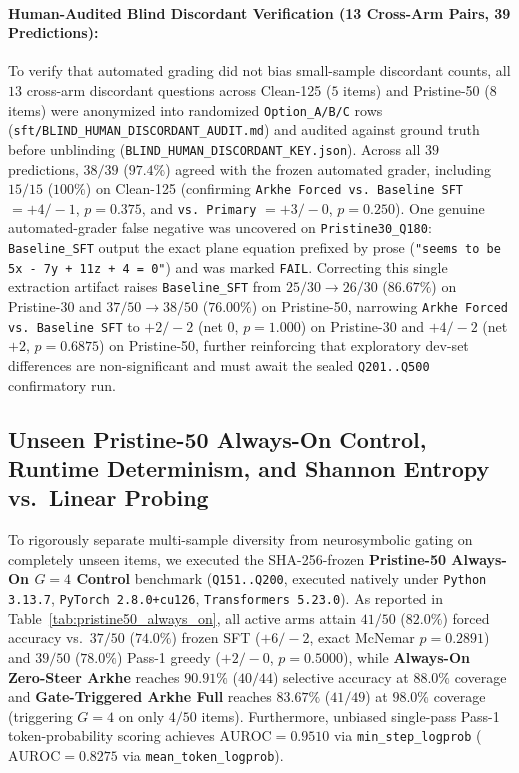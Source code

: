 \documentclass[11pt,a4paper]{article}
\begin{document}
\paragraph{Human-Audited Blind Discordant Verification (13 Cross-Arm Pairs, 39 Predictions):}
To verify that automated grading did not bias small-sample discordant counts, all $13$ cross-arm discordant questions across Clean-125 ($5$ items) and Pristine-50 ($8$ items) were anonymized into randomized \texttt{Option\_A/B/C} rows (\texttt{sft/BLIND\_HUMAN\_DISCORDANT\_AUDIT.md}) and audited against ground truth before unblinding (\texttt{BLIND\_HUMAN\_DISCORDANT\_KEY.json}). Across all $39$ predictions, $38 / 39$ ($97.4\%$) agreed with the frozen automated grader, including $15 / 15$ ($100\%$) on Clean-125 (confirming \texttt{Arkhe Forced vs.\ Baseline SFT} $= +4/-1$, $p=0.375$, and \texttt{vs.\ Primary} $= +3/-0$, $p=0.250$). One genuine automated-grader false negative was uncovered on \texttt{Pristine30\_Q180}: \texttt{Baseline\_SFT} output the exact plane equation prefixed by prose (\texttt{"seems to be 5x - 7y + 11z + 4 = 0"}) and was marked \texttt{FAIL}. Correcting this single extraction artifact raises \texttt{Baseline\_SFT} from $25/30 \to 26/30$ ($86.67\%$) on Pristine-30 and $37/50 \to 38/50$ ($76.00\%$) on Pristine-50, narrowing \texttt{Arkhe Forced vs.\ Baseline SFT} to $+2/-2$ (net $0$, $p=1.000$) on Pristine-30 and $+4/-2$ (net $+2$, $p=0.6875$) on Pristine-50, further reinforcing that exploratory dev-set differences are non-significant and must await the sealed \texttt{Q201..Q500} confirmatory run.

\subsection{Unseen Pristine-50 Always-On Control, Runtime Determinism, and Shannon Entropy vs.\ Linear Probing}

To rigorously separate multi-sample diversity from neurosymbolic gating on completely unseen items, we executed the SHA-256-frozen \textbf{Pristine-50 Always-On $G=4$ Control} benchmark (\texttt{Q151..Q200}, executed natively under \texttt{Python 3.13.7}, \texttt{PyTorch 2.8.0+cu126}, \texttt{Transformers 5.23.0}). As reported in Table~\ref{tab:pristine50_always_on}, all active arms attain $41/50$ ($82.0\%$) forced accuracy vs.\ $37/50$ ($74.0\%$) frozen SFT ($+6/-2$, exact McNemar $p = 0.2891$) and $39/50$ ($78.0\%$) Pass-1 greedy ($+2/-0$, $p = 0.5000$), while \textbf{Always-On Zero-Steer Arkhe} reaches $\mathbf{90.91\%}$ ($40/44$) selective accuracy at $88.0\%$ coverage and \textbf{Gate-Triggered Arkhe Full} reaches $\mathbf{83.67\%}$ ($41/49$) at $98.0\%$ coverage (triggering $G=4$ on only $4/50$ items). Furthermore, unbiased single-pass Pass-1 token-probability scoring achieves $\text{AUROC} = \mathbf{0.9510}$ via \texttt{min\_step\_logprob} ($\text{AUROC} = 0.8275$ via \texttt{mean\_token\_logprob}).
\end{document}
